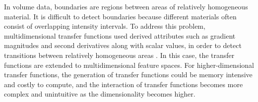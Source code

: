 
In volume data, boundaries are regions between areas of relatively homogeneous material. It is difficult to detect boundaries because different materials often consist of overlapping intensity intervals. To address this problem, multidimensional transfer functions used derived attributes such as gradient magnitudes and second derivatives along with scalar values, in order to detect transitions between relatively homogeneous areas \cite{kindlmann_semi-automatic_1998} \cite{kniss_multidimensional_2002} \cite{kindlmann_transfer_2002}.
In this case, the transfer functions are extended to multidimensional feature spaces.
For higher-dimensional transfer functions, the generation of transfer functions could be memory intensive and costly to compute,
and the interaction of transfer functions becomes more complex and unintuitive as the dimensionality becomes higher. 

